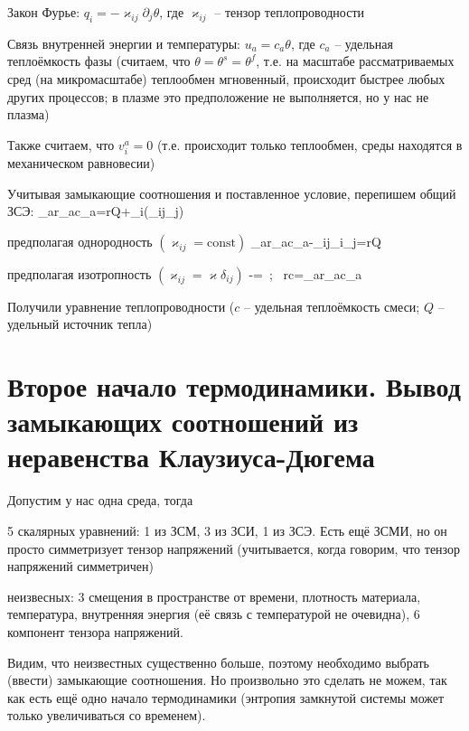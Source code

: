 \documentclass[main.tex]{subfiles}
\begin{document}
Закон Фурье: $q_i=-\varkappa_{ij}\partial_j\theta$, где $\varkappa_{ij}$ -- тензор теплопроводности

Связь внутренней энергии и температуры: $u_a=c_a\theta$, где $c_a$ -- удельная теплоёмкость фазы (считаем, что $\theta=\theta^s=\theta^f$, т.е. на масштабе рассматриваемых сред (на микромасштабе) теплообмен мгновенный, происходит быстрее любых других процессов; в плазме это предположение не выполняется, но у нас не плазма)

Также считаем, что $v_i^a=0$ (т.е. происходит только теплообмен, среды находятся в механическом равновесии)

Учитывая замыкающие соотношения и поставленное условие, перепишем общий ЗСЭ:
\beq\label{HT}
\sum\limits_{a}{r_ac_a}=rQ+\partial_i\left(\varkappa_{ij}\partial_j\theta\right)
\eeq

предполагая однородность $\left(\varkappa_{ij}=\text{const}\right)$
\beq
\sum\limits_{a}{r_ac_a}-\varkappa_{ij}\partial_i\partial_j\theta=rQ
\eeq

предполагая изотропность $\left(\varkappa_{ij}=\varkappa\delta_{ij}\right)$
\beq
{}-\Delta\theta=\,\,\,;\,\,\, rc=\sum\limits_{a}{r_ac_a}
\eeq

Получили уравнение теплопроводности ($c$ -- удельная теплоёмкость смеси; $Q$ -- удельный источник тепла)

\newpage
\section{Второе начало термодинамики. Вывод замыкающих соотношений из неравенства Клаузиуса-Дюгема}

Допустим у нас одна среда, тогда

5 скалярных уравнений: 1 из ЗСМ, 3 из ЗСИ, 1 из ЗСЭ. Есть ещё ЗСМИ, но он просто симметризует тензор напряжений (учитывается, когда говорим, что тензор напряжений симметричен)

неизвесных: 3 смещения в пространстве от времени, плотность материала, температура, внутренняя энергия (её связь с температурой не очевидна), 6 компонент тензора напряжений.

Видим, что неизвестных существенно больше, поэтому необходимо выбрать (ввести) замыкающие соотношения. Но произвольно это сделать не можем, так как есть ещё одно начало термодинамики (энтропия замкнутой системы может только увеличиваться со временем).
\end{document}
